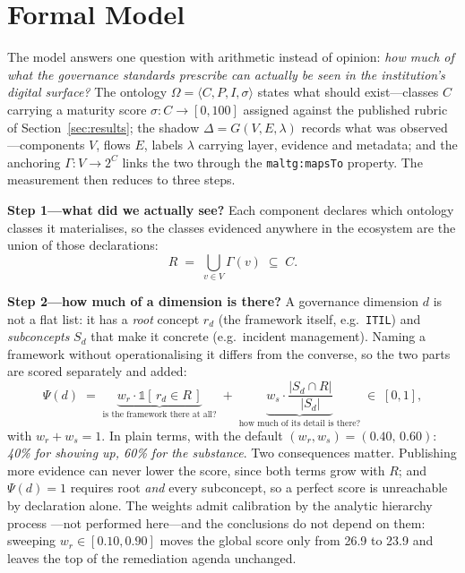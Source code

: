 \documentclass[engproc,proceedingpaper,submit,moreauthors]{Definitions/mdpi}
\begin{document}
\section{Formal Model}
\label{sec:formal}

The model answers one question with arithmetic instead of opinion: \emph{how much of what the governance standards prescribe can actually be seen in the institution's digital surface?} The ontology $\Omega=\langle C,P,I,\sigma\rangle$ states what should exist---classes $C$ carrying a maturity score $\sigma:C\to[0,100]$ assigned against the published rubric of Section~\ref{sec:results}; the shadow $\Delta=G(V,E,\lambda)$ records what was observed---components $V$, flows $E$, labels $\lambda$ carrying layer, evidence and metadata; and the anchoring $\Gamma:V\to 2^{C}$ links the two through the \texttt{maltg:mapsTo} property. The measurement then reduces to three steps.

\textbf{Step 1---what did we actually see?} Each component declares which ontology classes it materialises, so the classes evidenced anywhere in the ecosystem are the union of those declarations:
\begin{equation}
R \;=\; \bigcup_{v \in V} \Gamma(v) \;\subseteq\; C .
\label{eq:coverage-set}
\end{equation}

\textbf{Step 2---how much of a dimension is there?} A governance dimension $d$ is not a flat list: it has a \emph{root} concept $r_d$ (the framework itself, e.g.\ \texttt{ITIL}) and \emph{subconcepts} $S_d$ that make it concrete (e.g.\ incident management). Naming a framework without operationalising it differs from the converse, so the two parts are scored separately and added:
\begin{equation}
\Psi(d) \;=\; \underbrace{w_r \cdot \mathbb{1}\!\left[\, r_d \in R \,\right]}_{\text{is the framework there at all?}} \;+\; \underbrace{w_s \cdot \frac{\lvert S_d \cap R \rvert}{\lvert S_d \rvert}}_{\text{how much of its detail is there?}}\;\in\;[0,1],
\label{eq:psi}
\end{equation}
with $w_r+w_s=1$. In plain terms, with the default $(w_r,w_s)=(0.40,\,0.60)$: \emph{40\% for showing up, 60\% for the substance}. Two consequences matter. Publishing more evidence can never lower the score, since both terms grow with $R$; and $\Psi(d)=1$ requires root \emph{and} every subconcept, so a perfect score is unreachable by declaration alone. The weights admit calibration by the analytic hierarchy process \cite{Saaty1990}---not performed here---and the conclusions do not depend on them: sweeping $w_r\in[0.10,0.90]$ moves the global score only from 26.9 to 23.9 and leaves the top of the remediation agenda unchanged.
\end{document}
